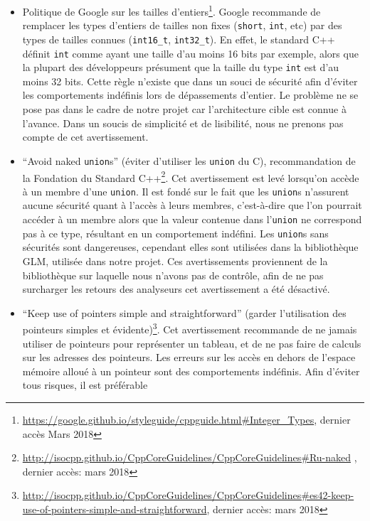 \begin{itemize}
\item
  Politique de Google sur les tailles
  d'entiers\footnote{\url{https://google.github.io/styleguide/cppguide.html\#Integer_Types}, dernier accès Mars 2018}. Google recommande de remplacer
  les types d'entiers de tailles non fixes (\texttt{short},
  \texttt{int}, etc) par des types de tailles connues
  (\texttt{int16\_t}, \texttt{int32\_t}). En effet, le standard C++
  définit \texttt{int} comme ayant une taille d'au moins 16 bits par
  exemple, alors que la plupart des développeurs présument que la taille
  du type \texttt{int} est d'au moins 32 bits. Cette règle n'existe que
  dans un souci de sécurité afin d'éviter les comportements indéfinis
  lors de dépassements d'entier. Le problème ne se pose pas dans le cadre
  de notre projet car l'architecture cible est connue à l'avance. Dans
  un soucis de simplicité et de lisibilité, nous ne prenons pas compte
  de cet avertissement.
\item
  ``Avoid naked \texttt{union}s'' (éviter d'utiliser les \texttt{union}
  du C), recommandation de la Fondation du Standard
  C++\footnote{\url{http://isocpp.github.io/CppCoreGuidelines/CppCoreGuidelines\#Ru-naked} , dernier accès: mars 2018}. Cet avertissement est levé
  lorsqu'on accède à un membre d'une \texttt{union}. Il est fondé sur le
  fait que les \texttt{union}s n'assurent aucune sécurité quant à
  l'accès à leurs membres, c'est-à-dire que l'on pourrait accéder à un
  membre alors que la valeur contenue dans l'\texttt{union} ne
  correspond pas à ce type, résultant en un comportement indéfini. Les
  \texttt{union}s sans sécurités sont dangereuses, cependant elles sont
  utilisées dans la bibliothèque GLM, utilisée dans notre projet. Ces
  avertissements proviennent de la bibliothèque sur laquelle nous
  n'avons pas de contrôle, afin de ne pas surcharger les retours des
  analyseurs cet avertissement a été désactivé.
\item
  ``Keep use of pointers simple and straightforward'' (garder
  l'utilisation des pointeurs simples et
  évidente)\footnote{\url{http://isocpp.github.io/CppCoreGuidelines/CppCoreGuidelines\#es42-keep-use-of-pointers-simple-and-straightforward}, dernier accès: mars 2018}. Cet avertissement recommande de
  ne jamais utiliser de pointeurs pour représenter un tableau, et de ne
  pas faire de calculs sur les adresses des pointeurs. Les erreurs sur
  les accès en dehors de l'espace mémoire alloué à un pointeur sont des
  comportements indéfinis. Afin d'éviter tous risques, il est préférable

\end{itemize}
